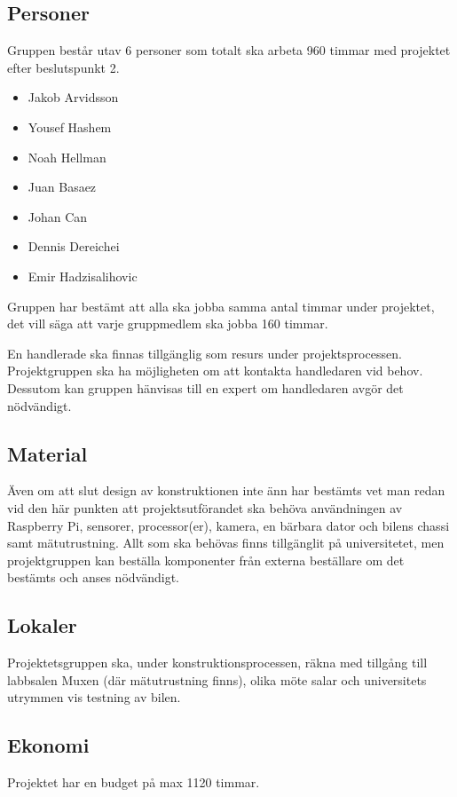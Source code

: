 \documentclass[projektplan/plan.tex]{subfiles}
\begin{document}
\subsection{Personer}
Gruppen består utav 6 personer som totalt ska arbeta 960 timmar med projektet efter beslutspunkt 2.

\begin{itemize}
\item Jakob Arvidsson
\item Yousef Hashem
\item Noah Hellman
\item Juan Basaez
\item Johan Can
\item Dennis Dereichei
\item Emir Hadzisalihovic
\end{itemize}

Gruppen har bestämt att alla ska jobba samma antal timmar under projektet, det vill säga att varje gruppmedlem ska jobba 160 timmar.
\newline\newline

En handlerade ska finnas tillgänglig som resurs under projektsprocessen. Projektgruppen ska ha möjligheten om att kontakta handledaren vid behov. Dessutom kan gruppen hänvisas till en expert om handledaren avgör det nödvändigt.

\subsection{Material}
Även om att slut design av konstruktionen inte änn har bestämts vet man redan vid den här punkten att projektsutförandet ska behöva användningen av Raspberry Pi, sensorer, processor(er), kamera, en bärbara dator och bilens chassi samt mätutrustning. Allt som ska behövas finns tillgänglit på universitetet, men projektgruppen kan beställa komponenter från externa beställare om det bestämts och anses nödvändigt.

\subsection{Lokaler}
Projektetsgruppen ska, under konstruktionsprocessen, räkna med tillgång till labbsalen Muxen (där mätutrustning finns), olika möte salar och universitets utrymmen vis testning av bilen.

\subsection{Ekonomi}
Projektet har en budget på max 1120 timmar.
\end{document}
